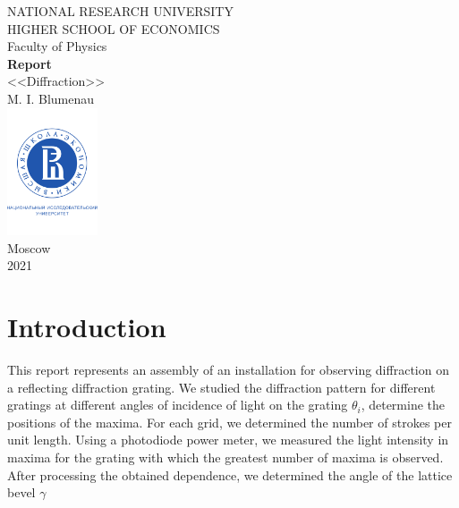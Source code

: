 \documentclass[a4paper, 12pt]{article}
\begin{document}
	\begin{titlepage}
		\begin{center}
			$$$$
			$$$$
			$$$$
			$$$$
			{\Large{NATIONAL RESEARCH UNIVERSITY}}\\
			\vspace{0.1cm}
			{\Large{HIGHER SCHOOL OF ECONOMICS}}\\
			\vspace{0.25cm}
			{\large{Faculty of Physics}}\\
			\vspace{5.5cm}
			{\Huge\textbf{{Report}}}\\%
			\vspace{1cm}
			{\LARGE{<<Diffraction>>}}\\%
			\vspace{1cm}
			{\large{M. I. Blumenau}}\\%
			\vspace{2cm}
			\vfill
			\includegraphics[width = 0.2\textwidth]{HSElogo}\\
			\vfill
			Moscow\\
			2021
		\end{center}
	\end{titlepage}
	
	\tableofcontents
	\newpage
	\section*{Introduction}
	This report represents an assembly of an installation for observing diffraction on a reflecting diffraction grating. We studied the diffraction pattern for different gratings at different angles of incidence of light on the grating $\theta_{i}$, determine the positions of the maxima. For each grid, we determined the number of strokes per unit length. Using a photodiode power meter, we measured the light intensity in maxima for the grating with which the greatest number of maxima is observed. After processing the obtained dependence, we determined the angle of the lattice bevel $ \gamma$
\end{document}
